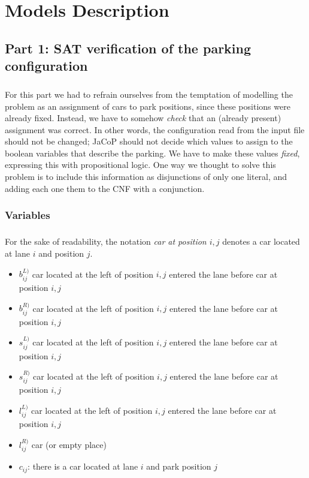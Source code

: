 
\chapter{Models Description}
\label{chapter: models description}









\section{Part 1: SAT verification of the parking configuration}

\paragraph{}
For this part we had to refrain ourselves from the temptation of modelling the problem as an assignment of cars to park positions, since these positions were already fixed. Instead, we have to somehow \textit{check} that an (already present) assignment was correct. In other words, the configuration read from the input file should not be changed; JaCoP should not decide which values to assign to the boolean variables that describe the parking. We have to make these values \textit{fixed}, expressing this with propositional logic. One way we thought to solve this problem is to include this information as disjunctions of only one literal, and adding each one them to the CNF with a conjunction.

\subsection{Variables}

\paragraph{}
For the sake of readability, the notation \textit{car at position $i,j$} denotes a car located at lane $i$ and position $j$.
\begin{itemize}
  \item $b^{L)}_{ij}$ car located at the left of position $i,j$ entered the lane before car at position $i,j$
  \item $b^{R)}_{ij}$ car located at the left of position $i,j$ entered the lane before car at position $i,j$
  \item $s^{L)}_{ij}$ car located at the left of position $i,j$ entered the lane before car at position $i,j$
  \item $s^{R)}_{ij}$ car located at the left of position $i,j$ entered the lane before car at position $i,j$
  \item $l^{L)}_{ij}$ car located at the left of position $i,j$ entered the lane before car at position $i,j$
  \item $l^{R)}_{ij}$ car (or empty place)
  \item $c_{ij}$: there is a car located at lane $i$ and park position $j$
\end{itemize}

